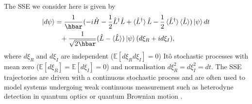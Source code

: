 \documentclass[12pt]{iopart} %
\begin{document}
The SSE we consider here is given by \cite{gisin1992quantum,strunz1998classical}
\begin{equation} \label{eq:SSE}
	\begin{aligned}
		\ket{d \psi } &= \frac{1}{\hbar}(-{i}\hat{H} -\frac{1}{2 }\hat{L}^{\dagger}\hat{L}+\braket{\hat{L}^{\dagger}}\hat{L} - \frac{1}{2}\braket{\hat{L}^{\dagger}}\braket{\hat{L}})\ket {\psi} dt \\
		 &\phantom{=}+ \frac{1}{\sqrt{2 \hbar}}(\hat{L}-\braket{\hat{L}})\ket{\psi} (d\xi_R +i d\xi_I),
	\end{aligned}
\end{equation} 
where $d\xi_R$ and $d\xi_I$ are independent ($\mathbb{E}[d\xi_Rd\xi_I]=0$)  It\^{o} stochastic processes with mean zero ($\mathbb{E}[d\xi_R]=\mathbb{E}[d\xi_I]=0$) and normalisation $d\xi_R^2=d\xi_I^2=dt$. The SSE trajectories are driven with a continuous stochastic process and are often used to model systems undergoing weak continuous measurement such as heterodyne detection in quantum optics \cite{wiseman1996quantum} or quantum Brownian motion \cite{petruccione}. 
 
\end{document}
